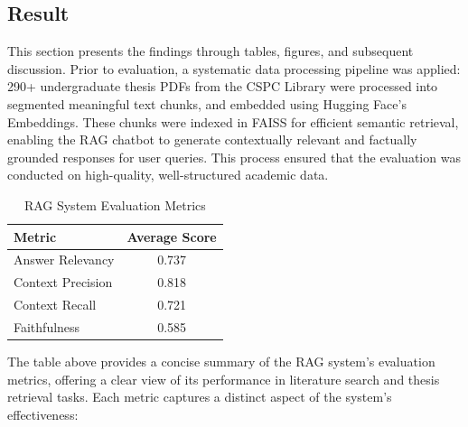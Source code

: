 \begin{refsection}
\section{Result}
This section presents the findings through tables, figures, and subsequent discussion. Prior to evaluation, a systematic data processing pipeline was applied: 290+ undergraduate thesis PDFs from the CSPC Library were processed into segmented meaningful text chunks, and embedded using Hugging Face's Embeddings. These chunks were indexed in FAISS for efficient semantic retrieval, enabling the RAG chatbot to generate contextually relevant and factually grounded responses for user queries. This process ensured that the evaluation was conducted on high-quality, well-structured academic data.

\begin{table}[H]
    \centering
    \caption{RAG System Evaluation Metrics}
    \begin{tabular}{|l|c|}
        \hline
        \textbf{Metric} & \textbf{Average Score} \\
        \hline
        Answer Relevancy   & 0.737 \\
        Context Precision  & 0.818 \\
        Context Recall     & 0.721 \\
        Faithfulness       & 0.585 \\
        \hline
    \end{tabular}
\end{table}

\noindent The table above provides a concise summary of the RAG system’s evaluation metrics, offering a clear view of its performance in literature search and thesis retrieval tasks. Each metric captures a distinct aspect of the system’s effectiveness:


\end{refsection}
